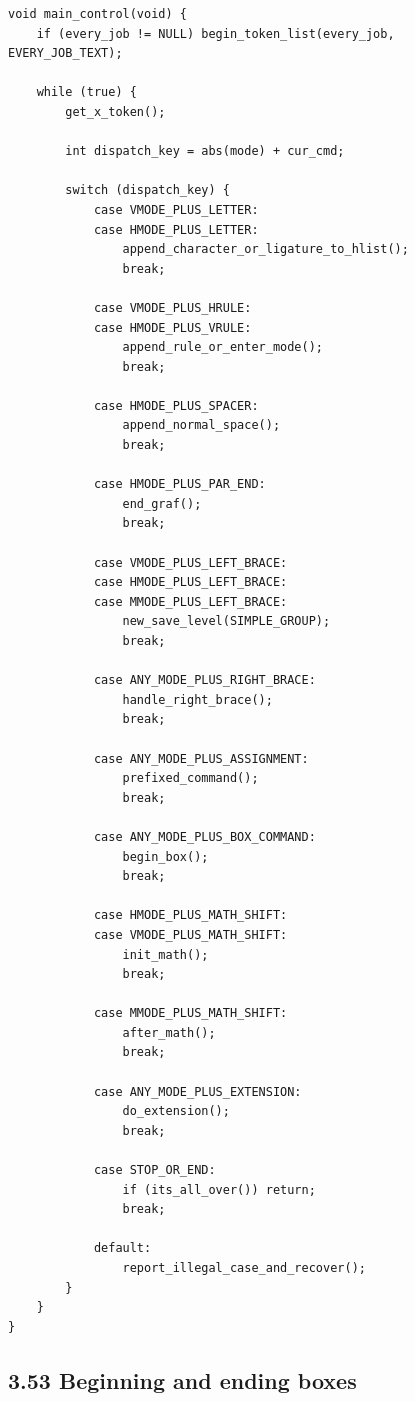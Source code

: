 \documentclass[11pt]{article}
\begin{document}
\begin{verbatim}
void main_control(void) {
    if (every_job != NULL) begin_token_list(every_job, EVERY_JOB_TEXT);

    while (true) {
        get_x_token();

        int dispatch_key = abs(mode) + cur_cmd;

        switch (dispatch_key) {
            case VMODE_PLUS_LETTER:
            case HMODE_PLUS_LETTER:
                append_character_or_ligature_to_hlist();
                break;

            case VMODE_PLUS_HRULE:
            case HMODE_PLUS_VRULE:
                append_rule_or_enter_mode();
                break;

            case HMODE_PLUS_SPACER:
                append_normal_space();
                break;

            case HMODE_PLUS_PAR_END:
                end_graf();
                break;

            case VMODE_PLUS_LEFT_BRACE:
            case HMODE_PLUS_LEFT_BRACE:
            case MMODE_PLUS_LEFT_BRACE:
                new_save_level(SIMPLE_GROUP);
                break;

            case ANY_MODE_PLUS_RIGHT_BRACE:
                handle_right_brace();
                break;

            case ANY_MODE_PLUS_ASSIGNMENT:
                prefixed_command();
                break;

            case ANY_MODE_PLUS_BOX_COMMAND:
                begin_box();
                break;

            case HMODE_PLUS_MATH_SHIFT:
            case VMODE_PLUS_MATH_SHIFT:
                init_math();
                break;

            case MMODE_PLUS_MATH_SHIFT:
                after_math();
                break;

            case ANY_MODE_PLUS_EXTENSION:
                do_extension();
                break;

            case STOP_OR_END:
                if (its_all_over()) return;
                break;

            default:
                report_illegal_case_and_recover();
        }
    }
}
\end{verbatim}

\subsection{3.53 Beginning and ending
boxes}\label{beginning-and-ending-boxes}
\end{document}
